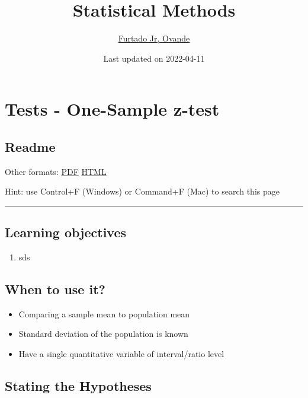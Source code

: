 \documentclass[
]{article}
\title{Statistical Methods}
\author{\href{http://drfurtado.us}{Furtado Jr, Ovande}}
\date{Last updated on 2022-04-11}
\providecommand{\tightlist}{%
  \setlength{\itemsep}{0pt}\setlength{\parskip}{0pt}}
\begin{document}
\maketitle

{
\setcounter{tocdepth}{2}
\tableofcontents
}
\hypertarget{tests---one-sample-z-test}{%
\section{Tests - One-Sample z-test}\label{tests---one-sample-z-test}}

\hypertarget{readme}{%
\subsection{Readme}\label{readme}}

Other formats: \href{2means.pdf}{PDF} \textbar{} \href{2means.html}{HTML}

Hint: use Control+F (Windows) or Command+F (Mac) to search this page

\begin{center}\rule{0.5\linewidth}{0.5pt}\end{center}

\hypertarget{learning-objectives}{%
\subsection{Learning objectives}\label{learning-objectives}}

\begin{enumerate}
\def\labelenumi{\arabic{enumi}.}
\tightlist
\item
  sds
\end{enumerate}

\hypertarget{when-to-use-it}{%
\subsection{When to use it?}\label{when-to-use-it}}

\begin{itemize}
\tightlist
\item
  Comparing a sample mean to population mean
\item
  Standard deviation of the population is known
\item
  Have a single quantitative variable of interval/ratio level
\end{itemize}

\hypertarget{stating-the-hypotheses}{%
\subsection{Stating the Hypotheses}\label{stating-the-hypotheses}}
\end{document}
